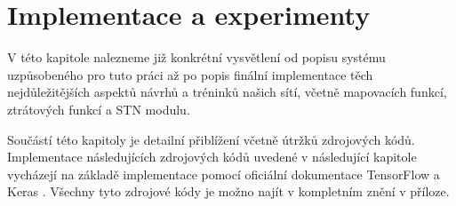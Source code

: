 \chapter{Implementace a experimenty}
\label{sec:Chapter5}
V této kapitole nalezneme již konkrétní vysvětlení od popisu systému uzpůsobeného pro tuto práci až po popis finální implementace těch nejdůležitějších aspektů návrhů a tréninků našich sítí, včetně mapovacích funkcí, ztrátových funkcí a STN modulu. 

Součástí této kapitoly je detailní přiblížení včetně útržků zdrojových kódů. Implementace následujících zdrojových kódů uvedené v následující kapitole vycházejí na základě implementace pomocí oficiální dokumentace TensorFlow a Keras \cite{tensorflow_doc}. Všechny tyto zdrojové kódy je možno najít v kompletním znění v příloze.

\endinput